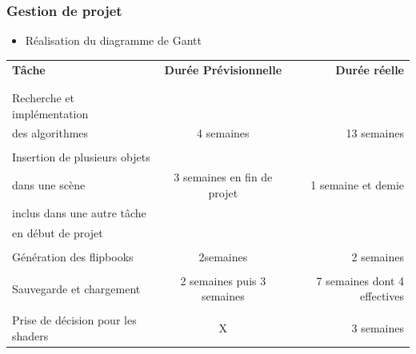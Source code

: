 \documentclass{beamer}
\begin{document}


\begin{frame}
\frametitle{Gestion de projet}
\begin{itemize}[label=$\bullet$]
\item Réalisation du diagramme de Gantt
\end{itemize}
{\fontsize{7}{8}\selectfont
{}
\begin{tabular}{lcr}

\textbf{Tâche} & \textbf{Durée Prévisionnelle} & \textbf{Durée réelle} \\
\\
\hline
\\
Recherche et implémentation \\des algorithmes &
4 semaines & 13 semaines \\
\hline
\\
Insertion de plusieurs objets \\ dans une scène &
3 semaines en fin de projet & 
1 semaine et demie \\ inclus dans 
une autre tâche \\ en début de projet \\
\hline
\\
Génération des flipbooks & 2semaines & 2 semaines \\
\hline
\\
Sauvegarde et chargement & 2 semaines puis 3 semaines &
7 semaines dont 4 effectives \\
\hline
\\
Prise de décision pour les shaders & X & 3 semaines\\

\end{tabular}
}
\end{frame}
\end{document}
